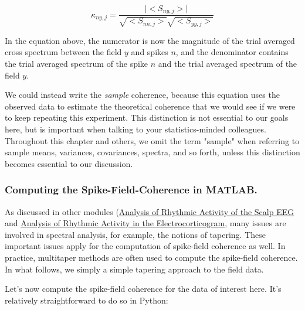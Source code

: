 \documentclass[11pt]{article}
\begin{document}
\[
\kappa_{ny,j} = \frac{ \mid <S_{ny,j}> \mid }{ \sqrt{<S_{nn,j}>} \sqrt{<S_{yy,j}>}}
\label{eq:SF_k}
\]

    In the equation above, the numerator is now the magnitude of the trial
averaged cross spectrum between the field \(y\) and spikes \(n\), and
the denominator contains the trial averaged spectrum of the spike \(n\)
and the trial averaged spectrum of the field \(y\).

    We could instead write the \emph{sample} coherence, because this
equation uses the observed data to estimate the theoretical coherence
that we would see if we were to keep repeating this experiment. This
distinction is not essential to our goals here, but is important when
talking to your statistics-minded colleagues. Throughout this chapter
and others, we omit the term "sample" when referring to sample means,
variances, covariances, spectra, and so forth, unless this distinction
becomes essential to our discussion.

    \subsubsection{Computing the Spike-Field-Coherence in
MATLAB.}\label{computing-the-spike-field-coherence-in-matlab.}

As discussed in other modules
(\href{../Analysis\%20of\%20Rhythmic\%20Activity\%20in\%20the\%20Scalp\%20EEG/Analysis\%20of\%20rhythmic\%20activity\%20in\%20the\%20Scalp\%20EEG.ipynb}{Analysis
of Rhythmic Activity of the Scalp EEG} and
\href{../Analysis\%20of\%20rhythmic\%20activity\%20in\%20the\%20Electrocorticogram/Analysis\%20of\%20rhythmic\%20activity\%20in\%20the\%20Electrocorticogram.ipynb}{Analysis
of Rhythmic Activity in the Electrocorticogram}, many issues are
involved in spectral analysis, for example, the notions of tapering.
These important issues apply for the computation of spike-field
coherence as well. In practice, multitaper methods are often used to
compute the spike-field coherence. In what follows, we simply a simple
tapering approach to the field data.

Let's now compute the spike-field coherence for the data of interest
here. It's relatively straightforward to do so in Python:
\end{document}

